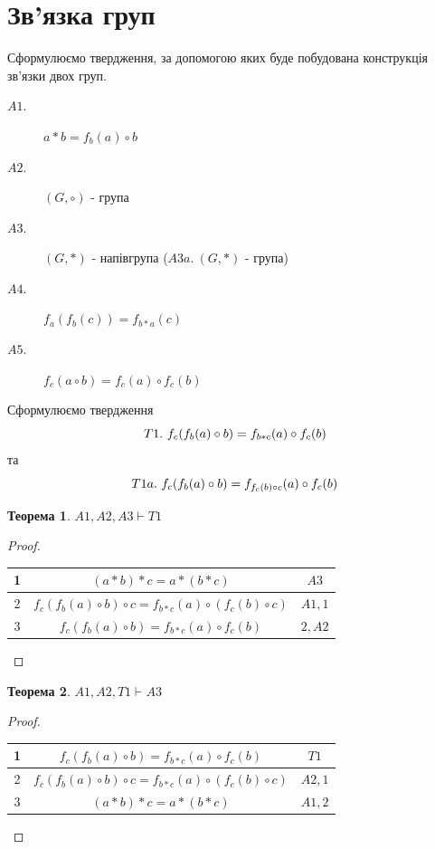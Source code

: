 \documentclass[a4paper,12pt]{article} \usepackage{a4wide}
\newcommand*{\hm}[1]{#1\nobreak\discretionary{}%
  {\hbox{$\mathsurround=0pt #1$}}{}} \newcommand{\bb}[1]{{\bf #1}}
\numberwithin{equation}{subsection}
\newtheorem{theorem}{Теорема}[subsection]
\begin{document}
  \section{Зв'язка груп}
  Сформулюємо твердження, за допомогою яких буде побудована
  конструкція зв'язки двох груп.
  \begin{description}
  \item[$A1.$] $ a * b=f_b(a) \circ b$
  \item[$A2.$] $(G,\circ) $ - група
  \item[$A3.$] $(G,*) $ - напівгрупа ($A3a.\ (G,*) $ - група)
  \item[$A4.$] $ f_a(f_b(c))=f_{b * a}(c)$
  \item[$A5.$] $ f_c(a \circ b)=f_c(a) \circ f_c(b)$

  \end{description}

  Сформулюємо твердження $$T1.\ f_c(f_b(a)\circ b)\hm=f_{b*c}(a)\circ
  f_c(b)$$ та $$T1a.\ f_c(f_b(a)\circ b)\hm=f_{f_c(b)\circ c}(a)\circ
  f_c(b)$$

\begin{theorem}
  $ A1,A2,A3\vdash T1$

\end{theorem}

\begin{proof}

\begin{tabular}{|c|c|c|}
  \hline
  1 & $(a*b)*c=a*(b*c)$ & $A3$\\
  \hline

  2 & $f_c(f_b(a)\circ b)\circ c=f_{b*c}(a)\circ (f_c(b)\circ c)$& $A1, 1$\\
  \hline

  3 & $f_c(f_b(a)\circ b)=f_{b*c}(a)\circ f_c(b)$& $2, A2$\\
  \hline
\end{tabular}

\end{proof}

\begin{theorem}
  $ A1,A2,T1\vdash A3$

\end{theorem}

\begin{proof}

\begin{tabular}{|c|c|c|}
  \hline
  1 & $f_c(f_b(a)\circ b)=f_{b*c}(a)\circ f_c(b)$& $T1$\\
  \hline

  2 & $f_c(f_b(a)\circ b)\circ c=f_{b*c}(a)\circ (f_c(b)\circ c)$& $A2, 1$\\
  \hline

  3 & $(a*b)*c=a*(b*c)$ & $A1, 2$\\
  \hline
\end{tabular}

\end{proof}
\end{document}
